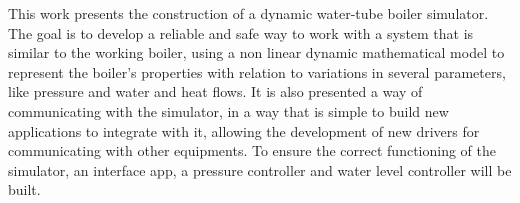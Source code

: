 This work presents the construction of a dynamic water-tube boiler
simulator. The goal is to develop a reliable and safe way to work with
a system that is similar to the working boiler, using a non linear
dynamic mathematical model to represent the boiler's properties with
relation to variations in several parameters, like pressure and water
and heat flows. It is also presented a way of communicating with the
simulator, in a way that is simple to build new applications to
integrate with it, allowing the development of new drivers for
communicating with other equipments. To ensure the correct functioning
of the simulator, an interface app, a pressure controller and water
level controller will be built.
